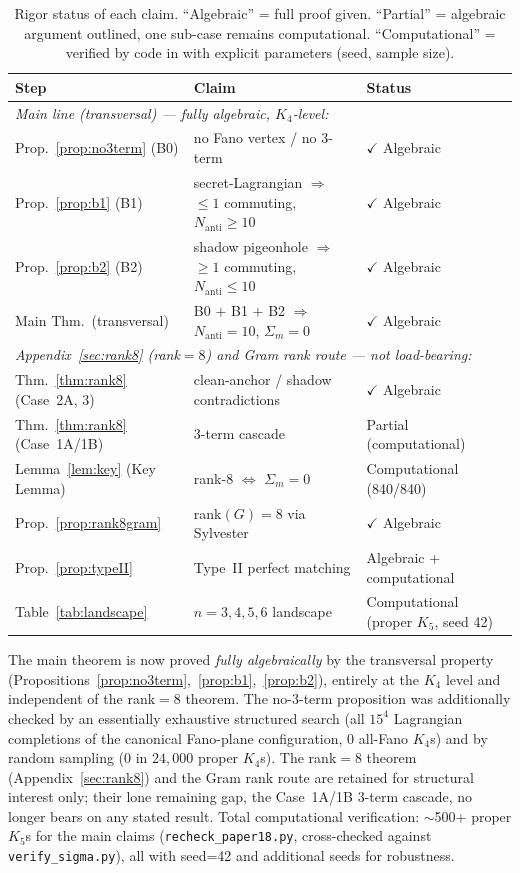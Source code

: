 \documentclass[11pt,a4paper]{article}
\theoremstyle{remark}
\begin{document}
\begin{table}[H]
\centering
\begin{tabular}{p{4.2cm}p{5.8cm}p{3.5cm}}
\toprule
Step & Claim & Status \\
\midrule
\multicolumn{3}{l}{\emph{Main line (transversal) --- fully algebraic, $K_4$-level:}}\\
Prop.~\ref{prop:no3term} (B0) & no Fano vertex / no 3-term & $\checkmark$ Algebraic \\
Prop.~\ref{prop:b1} (B1) & secret-Lagrangian $\Rightarrow$ $\leq 1$ commuting, $N_{\mathrm{anti}}\geq 10$ & $\checkmark$ Algebraic \\
Prop.~\ref{prop:b2} (B2) & shadow pigeonhole $\Rightarrow$ $\geq 1$ commuting, $N_{\mathrm{anti}}\leq 10$ & $\checkmark$ Algebraic \\
Main Thm.\ (transversal) & B0 $+$ B1 $+$ B2 $\Rightarrow$ $N_{\mathrm{anti}}=10$, $\Sigma_m=0$ & $\checkmark$ Algebraic \\
\midrule
\multicolumn{3}{l}{\emph{Appendix~\ref{sec:rank8} (rank$=8$) and Gram rank route --- not load-bearing:}}\\
Thm.~\ref{thm:rank8} (Case~2A, 3) & clean-anchor / shadow contradictions & $\checkmark$ Algebraic \\
Thm.~\ref{thm:rank8} (Case~1A/1B) & 3-term cascade & Partial (computational) \\
Lemma~\ref{lem:key} (Key Lemma) & rank-8 $\Leftrightarrow$ $\Sigma_m=0$ & Computational (840/840) \\
Prop.~\ref{prop:rank8gram} & rank$(G)=8$ via Sylvester & $\checkmark$ Algebraic \\
Prop.~\ref{prop:typeII} & Type~II perfect matching & Algebraic + computational \\
Table~\ref{tab:landscape} & $n=3,4,5,6$ landscape & Computational (proper $K_5$, seed 42) \\
\bottomrule
\end{tabular}
\caption{Rigor status of each claim. ``Algebraic'' = full proof given.
``Partial'' = algebraic argument outlined, one sub-case remains computational.
``Computational'' = verified by code in \cite{PaperXVIIIsuppl} with explicit
parameters (seed, sample size).}
\label{tab:rigor}
\end{table}

The main theorem is now proved \emph{fully algebraically} by the transversal
property (Propositions~\ref{prop:no3term},~\ref{prop:b1},~\ref{prop:b2}), entirely
at the $K_4$ level and independent of the rank$=8$ theorem. The no-3-term
proposition was additionally checked by an essentially exhaustive structured search
(all $15^4$ Lagrangian completions of the canonical Fano-plane configuration, $0$
all-Fano $K_4$s) and by random sampling ($0$ in $24{,}000$ proper $K_4$s).
The rank$=8$ theorem (Appendix~\ref{sec:rank8}) and the Gram rank route are retained
for structural interest only; their lone remaining gap, the Case~1A/1B 3-term
cascade, no longer bears on any stated result.
Total computational verification: $\sim$500+ proper $K_5$s for the main claims
(\texttt{recheck\_paper18.py}, cross-checked against \texttt{verify\_sigma.py}),
all with seed=42 and additional seeds for robustness.
\end{document}
